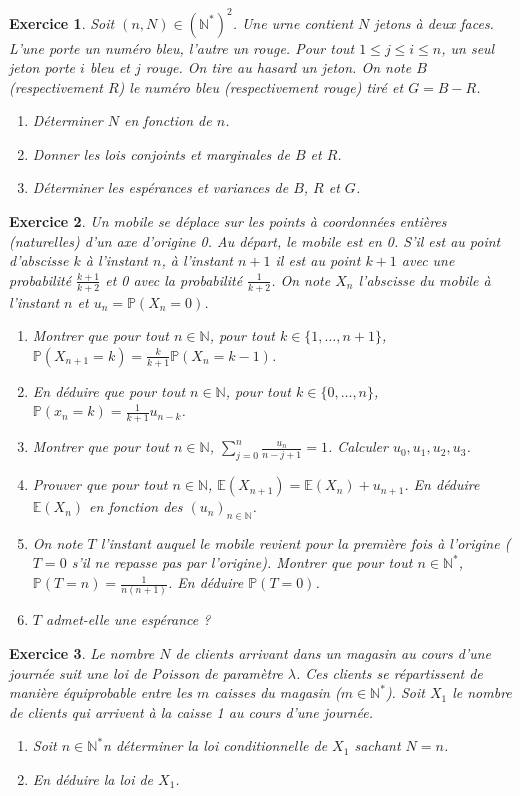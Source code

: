 \documentclass[12pt]{article}
\newtheorem{exercise}{Exercice}[section]
\theoremstyle{remark}
\theoremstyle{remark}
\newcommand{\N}{\mathbb{N}}
\newcommand{\E}{\mathbb{E}}
\renewcommand{\P}{\mathbb{P}}
\begin{document}
\begin{exercise}
	Soit $(n,N)\in(\N^{*})^{2}$. Une urne contient $N$ jetons à deux faces.
	L'une porte un numéro bleu, l'autre un rouge. Pour tout $1\leqslant
	j\leqslant i\leqslant n$, un seul jeton porte $i$ bleu et $j$ rouge. On tire
	au hasard un jeton. On note $B$ (respectivement $R$) le numéro bleu
	(respectivement rouge) tiré et $G=B-R$.
	\begin{enumerate}
		\item Déterminer $N$ en fonction de $n$.
		\item Donner les lois conjoints et marginales de $B$ et $R$.
		\item Déterminer les espérances et variances de $B$, $R$ et $G$.
	\end{enumerate}
\end{exercise}

\begin{exercise}
	Un mobile se déplace sur les points à coordonnées entières (naturelles) d'un
	axe d'origine 0. Au départ, le mobile est en 0. S'il est au point d'abscisse
	$k$ à l'instant $n$, à l'instant $n+1$ il est au point $k+1$ avec une
	probabilité $\frac{k+1}{k+2}$ et 0 avec la probabilité $\frac{1}{k+2}$. On
	note $X_{n}$ l'abscisse du mobile à l'instant $n$ et $u_{n}=\P(X_{n}=0)$.
	\begin{enumerate}
		\item Montrer que pour tout $n\in\N$, pour tout $k\in\{1,\dots,n+1\}$, $\P(X_{n+1}=k)=\frac{k}{k+1}\P(X_{n}=k-1)$.
		\item En déduire que pour tout $n\in\N$, pour tout $k\in\{0,\dots,n\}$, $\P(x_{n}=k)=\frac{1}{k+1}u_{n-k}$.
		\item Montrer que pour tout $n\in\N$,
		$\sum_{j=0}^{n}\frac{u_{n}}{n-j+1}=1$. Calculer
		$u_{0},u_{1},u_{2},u_{3}$.
		\item Prouver que pour tout $n\in\N$, $\E(X_{n+1})=\E(X_{n})+u_{n+1}$.
		En déduire $\E(X_{n})$ en fonction des $(u_{n})_{n\in\N}$.
		\item On note $T$ l'instant auquel le mobile revient pour la première
		fois à l'origine ($T=0$ s'il ne repasse pas par l'origine). Montrer que
		pour tout $n\in\N^{*}$, $\P(T=n)=\frac{1}{n(n+1)}$. En déduire
		$\P(T=0)$.
		\item $T$ admet-elle une espérance ?
	\end{enumerate}
\end{exercise}

\begin{exercise}
	Le nombre $N$ de clients arrivant dans un magasin au cours d'une journée
	suit une loi de Poisson de paramètre $\lambda$. Ces clients se répartissent
	de manière équiprobable entre les $m$ caisses du magasin ($m\in\N^{*}$).
	Soit $X_{1}$ le nombre de clients qui arrivent à la caisse 1 au cours d'une
	journée. 
	\begin{enumerate}
		\item Soit $n\in\N^{*}$n déterminer la loi conditionnelle de $X_{1}$
		sachant $N=n$.
		\item En déduire la loi de $X_{1}$.
	\end{enumerate}
\end{exercise}
\end{document}
